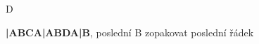 \documentclass[timestamp]{jazzgrid}
\begin{document}
\begin{musicsection}{D}
\barline
	{\barfour{}
		{}
		{}
		{}
		{}
	}
	{\barfour{}
		{}
		{}
		{}
		{}
	}
	{\barfour{}
		{}
		{}
		{}
		{}
	}
	{\barfour{}
		{}
		{}
		{}
		{}
	}
\barline
	{\barfour{}
		{}
		{}
		{}
		{}
	}
	{\barfour{}
		{}
		{}
		{}
		{}
	}
	{\barfour{}
		{}
		{}
		{}
		{}
	}
	{\barfour{}
		{}
		{}
		{}
		{}
	}
\barline
	{\barfour{}
		{}
		{}
		{}
		{}
	}
	{\barfour{}
		{}
		{}
		{}
		{}
	}
	{\barfour{}
		{}
		{}
		{}
		{}
	}
	{\barfour{}
		{}
		{}
		{}
		{}
	}
\barline
	{\barfour{}
		{}
		{}
		{}
		{}
	}
	{\barfour{}
		{}
		{}
		{}
		{}
	}
	{\barfour{}
		{}
		{}
		{}
		{}
	}
	{\barfour{}
		{}
		{}
		{}
		{}
	}
\end{musicsection}
\tiny
\textbf{|ABCA|ABDA|B}, poslední B zopakovat poslední řádek
\end{document}
